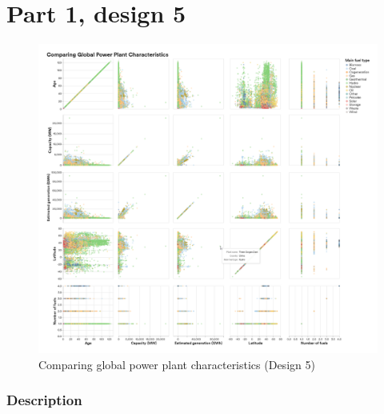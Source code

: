 \hypertarget{part-1-design-5}{
\section{Part 1, design 5}\label{part-1-design-5}}

\begin{figure}[ht]
  \centering
  \includegraphics[width=\textwidth]{../img/design5}
  \caption{Comparing global power plant characteristics (Design 5)}
\end{figure}

\hypertarget{description}{
\subsubsection{Description}\label{description}}

